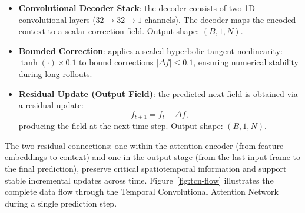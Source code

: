 \begin{itemize}
    \item \textbf{Convolutional Decoder Stack}: the decoder consists of two 1D convolutional layers ($32 \to 32 \to 1$ channels). The decoder maps the encoded context to a scalar correction field. Output shape: $(B, 1, N)$.
    
    \item \textbf{Bounded Correction}: applies a scaled hyperbolic tangent nonlinearity: $\tanh(\cdot)\times 0.1$ to bound corrections $|\Delta f| \leq 0.1$, ensuring numerical stability during long rollouts.
    
    \item \textbf{Residual Update (Output Field)}: the predicted next field is obtained via a residual update: $$f_{t+1} = f_t + \Delta f,$$ producing the field at the next time step. Output shape: $(B, 1, N)$.
\end{itemize}

\noindent The two residual connections: one within the attention encoder (from feature embeddings to context) and one in the output stage (from the last input frame to the final prediction), preserve critical spatiotemporal information and support stable incremental updates across time. Figure~\ref{fig:tcn-flow} illustrates the complete data flow through the Temporal Convolutional Attention Network during a single prediction step.\\

